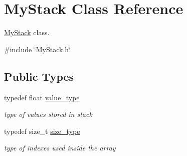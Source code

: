 \hypertarget{class_my_stack}{}\section{My\+Stack Class Reference}
\label{class_my_stack}


\hyperlink{class_my_stack}{My\+Stack} class.  




{\ttfamily \#include \char`\"{}My\+Stack.\+h\char`\"{}}

\subsection*{Public Types}
\begin{DoxyCompactItemize}
\item 
\mbox{\label{class_my_stack_aef491ce2544b335e96d24a39ad23bc7c}} 
typedef float \hyperlink{class_my_stack_aef491ce2544b335e96d24a39ad23bc7c}{value\+\_\+type}
\begin{DoxyCompactList}\small\item\em type of values stored in stack \end{DoxyCompactList}\item 
\mbox{\label{class_my_stack_a6e8ab1801eb1cf3b66928e0c0f2fe0fe}} 
typedef size\+\_\+t \hyperlink{class_my_stack_a6e8ab1801eb1cf3b66928e0c0f2fe0fe}{size\+\_\+type}
\begin{DoxyCompactList}\small\item\em type of indexes used inside the array \end{DoxyCompactList}\end{DoxyCompactItemize}
